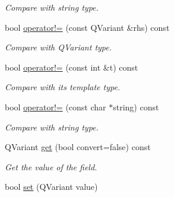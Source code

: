 \begin{DoxyCompactItemize}
\begin{DoxyCompactList}\small\item\em Compare with string type. \item\end{DoxyCompactList}\item 
\hypertarget{classDQField_a08325fc85199eb54268f8753b0e9668b}{
bool \hyperlink{classDQField_a08325fc85199eb54268f8753b0e9668b}{operator!=} (const QVariant \&rhs) const}
\label{classDQField_a08325fc85199eb54268f8753b0e9668b}

\begin{DoxyCompactList}\small\item\em Compare with QVariant type. \item\end{DoxyCompactList}\item 
\hypertarget{classDQField_a3938d43781be5c4b3f8db191e0be8ea3}{
bool \hyperlink{classDQField_a3938d43781be5c4b3f8db191e0be8ea3}{operator!=} (const int \&t) const}
\label{classDQField_a3938d43781be5c4b3f8db191e0be8ea3}

\begin{DoxyCompactList}\small\item\em Compare with its template type. \item\end{DoxyCompactList}\item 
\hypertarget{classDQField_a6713be2b5fa4a2937265be13bbf4eb56}{
bool \hyperlink{classDQField_a6713be2b5fa4a2937265be13bbf4eb56}{operator!=} (const char $\ast$string) const}
\label{classDQField_a6713be2b5fa4a2937265be13bbf4eb56}

\begin{DoxyCompactList}\small\item\em Compare with string type. \item\end{DoxyCompactList}\item 
\hypertarget{classDQField_a17e36ac914ae0dd938f081f9ade514c7}{
QVariant \hyperlink{classDQField_a17e36ac914ae0dd938f081f9ade514c7}{get} (bool convert=false) const}
\label{classDQField_a17e36ac914ae0dd938f081f9ade514c7}

\begin{DoxyCompactList}\small\item\em Get the value of the field. \item\end{DoxyCompactList}\item 
\hypertarget{classDQField_a6d53fed742befb445301aa5b99b45489}{
bool \hyperlink{classDQField_a6d53fed742befb445301aa5b99b45489}{set} (QVariant value)}
\label{classDQField_a6d53fed742befb445301aa5b99b45489}


\end{DoxyCompactItemize}
